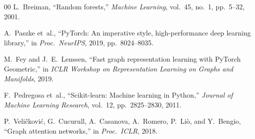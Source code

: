 \documentclass[conference]{IEEEtran}
\begin{document}
\begin{thebibliography}{00}
L.~Breiman, ``Random forests,'' \textit{Machine Learning}, vol.~45, no.~1, pp.\ 5--32, 2001.

A.~Paszke et~al., ``PyTorch: An imperative style, high-performance deep learning library,'' in \textit{Proc.\ NeurIPS}, 2019, pp.\ 8024--8035.

M.~Fey and J.~E.~Lenssen, ``Fast graph representation learning with PyTorch Geometric,'' in \textit{ICLR Workshop on Representation Learning on Graphs and Manifolds}, 2019.

F.~Pedregosa et~al., ``Scikit-learn: Machine learning in Python,'' \textit{Journal of Machine Learning Research}, vol.~12, pp.\ 2825--2830, 2011.

P.~Veli\v{c}kovi\'{c}, G.~Cucurull, A.~Casanova, A.~Romero, P.~Li\`{o}, and Y.~Bengio, ``Graph attention networks,'' in \textit{Proc.\ ICLR}, 2018.

\end{thebibliography}
\end{document}
